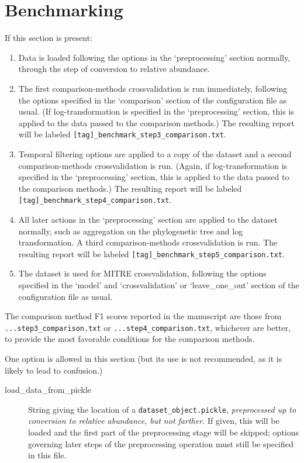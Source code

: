 \documentclass[12pt]{report}
\begin{document}
\section{Benchmarking}\label{benchmarking}
If this section is present:
\begin{enumerate}
\item Data is loaded following the options in the `preprocessing' section
    normally, through the step of conversion to relative abundance. 

\item The first comparison-methods crossvalidation is run immediately,
  following the options specified in the `comparison' section of the
  configuration file as usual. (If log-transformation is specified in
  the `preprocessing' section, this is applied to the data passed to the
  comparison methods.) The resulting report will be labeled
  \texttt{[tag]\_benchmark\_step3\_comparison.txt}.

\item Temporal filtering options are applied to a copy of the dataset
  and a second comparison-methods crossvalidation is run. (Again, if
  log-transformation is specified in the `preprocessing' section, this
  is applied to the data passed to the comparison methods.)  The
  resulting report will be labeled
  \texttt{[tag]\_benchmark\_step4\_comparison.txt}.

\item All later actions in the `preprocessing' section are applied to
  the dataset normally, such as aggregation on the phylogenetic tree
  and log transformation. A third comparison-methods crossvalidation
  is run. The resulting report will be labeled
  \texttt{[tag]\_benchmark\_step5\_comparison.txt}.
    
\item The dataset is used for MITRE crossvalidation, following the
  options specified in the `model' and `crossvalidation' or
  `leave\_one\_out' section of the configuration file as usual.
\end{enumerate}

The comparison method F1 scores reported in the manuscript are those
from \texttt{...step3\_comparison.txt} or \texttt{...step4\_comparison.txt},
whichever are better, to provide the most favorable conditions for the
comparison methods.

One option is allowed in this section (but its use is
not recommended, as it is likely to lead to confusion.)
\begin{description}
\item[load\_data\_from\_pickle] String giving the location of a
  \texttt{dataset\_object.pickle}, \textit{preprocessed up to
    conversion to relative abundance, but not farther.} If given, this
  will be loaded and the first part of the preprocessing stage will be
  skipped; options governing later steps of the preprocessing
  operation must still be specified in this file.
\end{description}
\end{document}
